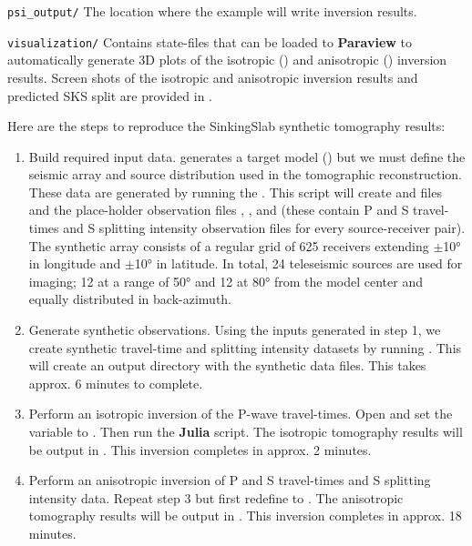 \texttt{psi\_output/} The location where the example will write inversion results.

\texttt{visualization/} Contains state-files that can be loaded to \textbf{Paraview} to automatically generate 3D plots of the isotropic () and anisotropic () inversion results. Screen shots of the isotropic and anisotropic inversion results and predicted SKS split are provided in .


Here are the steps to reproduce the SinkingSlab synthetic tomography results:
\begin{enumerate}
    \item Build required input data. \viztomotitle{} generates a target model () but we must define the seismic array and source distribution used in the tomographic reconstruction. These data are generated by running the . This script will create  and  files and the place-holder observation files , , and  (these contain P and S travel-times and S splitting intensity observation files for every source-receiver pair). The synthetic array consists of a regular grid of 625 receivers extending $\pm$10° in longitude and $\pm$10° in latitude. In total, 24 teleseismic sources are used for imaging; 12 at a range of 50° and 12 at 80° from the model center and equally distributed in back-azimuth.
    
    \item Generate synthetic observations. Using the inputs generated in step 1, we create synthetic travel-time and splitting intensity datasets by running . This will create an output directory  with the synthetic data files. This takes approx. 6 minutes to complete.
    
    \item Perform an isotropic inversion of the P-wave travel-times. Open  and set the variable  to . Then run the \textbf{Julia} script. The isotropic tomography results will be output in . This inversion completes in approx. 2 minutes.

    \item Perform an anisotropic inversion of P and S travel-times and S splitting intensity data. Repeat step 3 but first redefine  to . The anisotropic tomography results will be output in . This inversion completes in approx. 18 minutes.
    

\end{enumerate}
